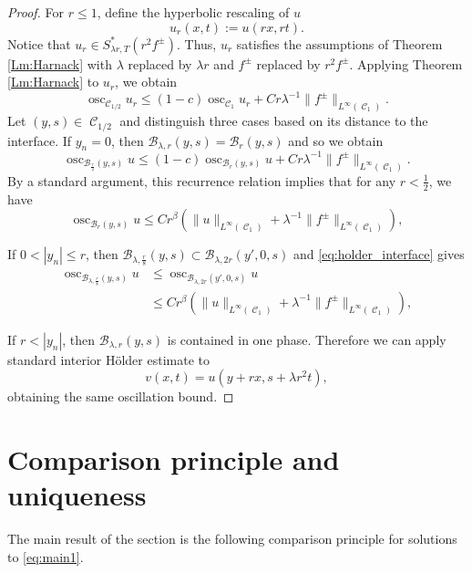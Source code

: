 \documentclass[12pt]{article}
\numberwithin{Theorem}{section}
\theoremstyle{definition}
\theoremstyle{remark}
\numberwithin{equation}{section}
\DeclareMathOperator{\C}{\mathcal{C}}
\newcommand{\osc}{\operatorname{osc}}
\begin{document}
\begin{proof}
    For $r \leq 1$, define the hyperbolic rescaling of $u$ 
    \[
    u_r(x,t):=u(rx,rt).
    \]
    Notice that $u_r \in S^*_{\lambda r,T}(r^2 f^\pm)$. Thus, $u_r$ satisfies the assumptions of Theorem \ref{Lm:Harnack} with $\lambda$ replaced by $\lambda r$ and $f^\pm$ replaced by $r^2 f^\pm$. Applying Theorem \ref{Lm:Harnack} to $u_r$, we obtain
    \[
    \osc_{\C_{1/2}} u_r \leq (1-c) \osc_{\C_1} u_r + C r \lambda^{-1} \| f^\pm\|_{L^\infty(\C_1)}.
    \]
Let $(y,s) \in \C_{1/2}$ and distinguish three cases based on its distance to the interface.
If \(y_n=0\), then $\mathcal{B}_{\lambda,r} (y,s) = \mathcal{B}_{r} (y,s)$ and so we obtain
    \begin{equation*}
         \osc_{\mathcal{B}_{\frac{r}{2}}(y,s)} u \leq (1-c)  \osc_{\mathcal{B}_{r}(y,s)} u + C r \lambda^{-1} \|f^\pm\|_{L^\infty(\C_1)}.
    \end{equation*}
    By a standard argument, this recurrence relation implies that for any $r < \frac{1}{2}$, we have
    \begin{equation} \label{eq:holder_interface}
         \osc_{\mathcal{B}_{r}(y,s)} u \leq C r^\beta \left( \|u\|_{L^\infty(\C_1)} + \lambda^{-1} \|f^\pm\|_{L^\infty(\C_1)} \right),
    \end{equation}

If \(0<|y_n|\le r\), then $\mathcal{B}_{\lambda,\frac{r}{8}}(y,s) \subset \mathcal{B}_{\lambda,2r}(y',0,s)$
 and \eqref{eq:holder_interface} gives
    \begin{align*}
        \osc_{\mathcal{B}_{\lambda,\frac{r}{8}}(y,s)} u &\leq \osc_{\mathcal{B}_{\lambda,2r}(y',0,s)} u  \\
        &\leq C r^\beta \left( \|u\|_{L^\infty(\C_1)} + \lambda^{-1} \|f^\pm\|_{L^\infty(\C_1)} \right),
    \end{align*}

If \(r<|y_n|\), then \(\mathcal B_{\lambda,r}(y,s)\) is contained in one
phase. Therefore we can apply standard interior H\"older estimate to
\[
v(x,t)=u(y+rx,s+\lambda r^2t),
\]
obtaining the same oscillation bound.
    
\end{proof}


\section{Comparison principle and uniqueness} \label{sec:compare}


The main result of the section is the following comparison principle for solutions to \eqref{eq:main1}. 
\end{document}
